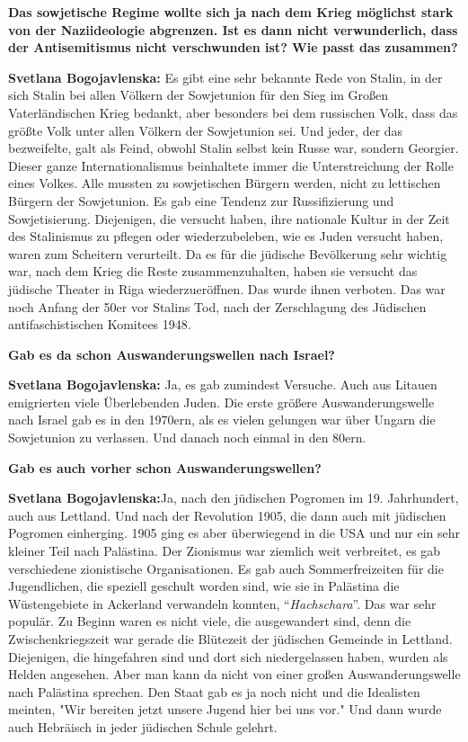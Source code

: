 \textbf{Das sowjetische Regime wollte sich ja nach dem Krieg möglichst stark von der Naziideologie abgrenzen. Ist es dann nicht verwunderlich, dass der Antisemitismus nicht verschwunden ist? Wie passt das zusammen?}

\textbf{Svetlana Bogojavlenska:} Es gibt eine sehr bekannte Rede von Stalin, in der sich Stalin bei allen Völkern der Sowjetunion für den Sieg im Großen Vaterländischen Krieg bedankt, aber besonders bei dem russischen Volk, dass das größte Volk unter allen Völkern der Sowjetunion sei. Und jeder, der das bezweifelte, galt als Feind, obwohl Stalin selbst kein Russe war, sondern Georgier. Dieser ganze Internationalismus beinhaltete immer die Unterstreichung der Rolle eines Volkes. Alle mussten zu sowjetischen Bürgern werden, nicht zu lettischen Bürgern der Sowjetunion. Es gab eine Tendenz zur Russifizierung und Sowjetisierung. Diejenigen, die versucht haben, ihre nationale Kultur in der Zeit des Stalinismus zu pflegen oder wiederzubeleben, wie es Juden versucht haben, waren zum Scheitern verurteilt. Da es für die jüdische Bevölkerung sehr wichtig war, nach dem Krieg die Reste zusammenzuhalten, haben sie versucht das jüdische Theater in Riga wiederzueröffnen. Das wurde ihnen verboten. 
Das war noch Anfang der 50er vor Stalins Tod, nach der Zerschlagung des Jüdischen antifaschistischen Komitees 1948.

\textbf{Gab es da schon Auswanderungswellen nach Israel?}

\textbf{Svetlana Bogojavlenska:} Ja, es gab zumindest Versuche. Auch aus Litauen emigrierten viele Überlebenden Juden. Die erste größere Auswanderungswelle nach Israel gab es in den 1970ern, als es vielen gelungen war über Ungarn die Sowjetunion zu verlassen. Und danach noch einmal in den 80ern. 

\textbf{Gab es auch vorher schon Auswanderungswellen?}

\textbf{Svetlana Bogojavlenska:}Ja, nach den jüdischen Pogromen im 19. Jahrhundert, auch aus Lettland. Und nach der Revolution 1905, die dann auch mit jüdischen Pogromen einherging. 1905 ging es aber überwiegend in die USA und nur ein sehr kleiner Teil nach Palästina. Der Zionismus war ziemlich weit verbreitet, es gab verschiedene zionistische Organisationen. Es gab auch Sommerfreizeiten für die Jugendlichen, die speziell geschult worden sind, wie sie in Palästina die Wüstengebiete in Ackerland verwandeln konnten, "`\textit{Hachschara}"'. Das war sehr populär. Zu Beginn waren es nicht viele, die ausgewandert sind, denn die Zwischenkriegszeit war gerade die Blütezeit der jüdischen Gemeinde in Lettland. Diejenigen, die hingefahren sind und dort sich niedergelassen haben, wurden als Helden angesehen. Aber man kann da nicht von einer großen Auswanderungswelle nach Palästina sprechen. Den Staat gab es ja noch nicht und die Idealisten meinten, "Wir bereiten jetzt unsere Jugend hier bei uns vor." Und dann wurde auch Hebräisch in jeder jüdischen Schule gelehrt.

